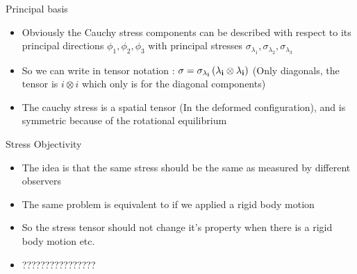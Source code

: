 	\begin{frame}{Principal basis}
		\begin{itemize}
			\item Obviously the Cauchy stress components can be described with respect to its principal directions $\phi_1,\phi_2,\phi_3$ with principal stresses $\sigma_{\lambda_1},\sigma_{\lambda_2},\sigma_{\lambda_3}$
			\item So we can write in tensor notation :
			$\mathbf{\sigma = \sigma_{\lambda_i} \left(\lambda_i \otimes \lambda_i \right)}$
			(Only diagonals, the tensor is $i \otimes i$ which only is for the diagonal components)
			\item The cauchy stress is a spatial tensor (In the deformed configuration), and is symmetric because of the rotational equilibrium
		\end{itemize}
	\end{frame}

	\begin{frame}{Stress Objectivity}
		\begin{itemize}
			\item The idea is that the same stress should be the same as measured by different observers
			\item The same problem is equivalent to if we applied a rigid body motion
			\item So the stress tensor should not change it's property when there is a rigid body motion etc.
			\item ???????????????? 
			
		\end{itemize}
	\end{frame}


